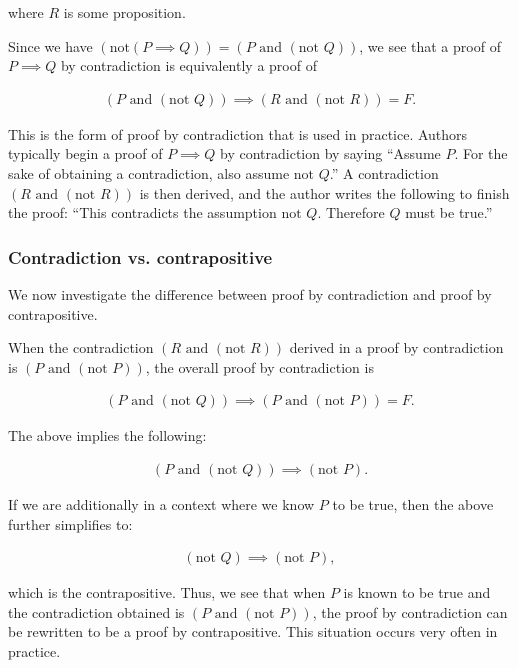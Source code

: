 where $R$ is some proposition.

Since we have $(\text{not}(P \implies Q)) = (P \text{ and } (\text{not } Q))$, we see that a proof of $P \implies Q$ by contradiction is equivalently a proof of

\begin{align*}
    (P \text{ and } (\text{not } Q)) \implies (R \text{ and } (\text{not } R)) = F.
\end{align*}

This is the form of proof by contradiction that is used in practice. Authors typically begin a proof of $P \implies Q$ by contradiction by saying ``Assume $P$. For the sake of obtaining a contradiction, also assume $\text{not } Q$.'' A contradiction $(R \text{ and } (\text{not } R))$ is then derived, and the author writes the following to finish the proof: ``This contradicts the assumption $\text{not } Q$. Therefore $Q$ must be true.'' 

\subsubsection*{Contradiction vs. contrapositive}

We now investigate the difference between proof by contradiction and proof by contrapositive. 

When the contradiction $(R \text{ and } (\text{not } R))$ derived in a proof by contradiction is $(P \text{ and } (\text{not } P))$, the overall proof by contradiction is

\begin{align*}
    (P \text{ and } (\text{not } Q)) \implies (P \text{ and } (\text{not } P)) = F.
\end{align*}

The above implies the following:

\begin{align*}
    (P \text{ and } (\text{not } Q)) \implies (\text{not } P).
\end{align*}

If we are additionally in a context where we know $P$ to be true, then the above further simplifies to:

\begin{align*}
    (\text{not } Q) \implies (\text{not } P),
\end{align*}

which is the contrapositive. Thus, we see that when $P$ is known to be true and the contradiction obtained is $(P \text{ and } (\text{not } P))$, the proof by contradiction can be rewritten to be a proof by contrapositive. This situation occurs very often in practice.

